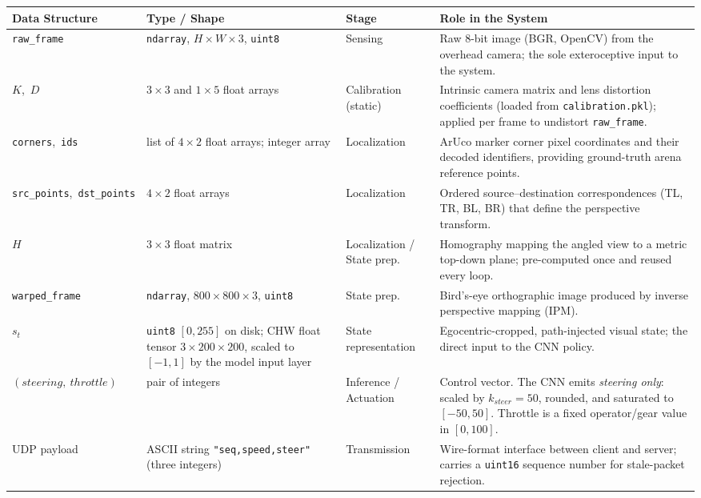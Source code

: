 \begin{table}[H]
\centering
\footnotesize
\renewcommand{\arraystretch}{1.4}
\setlength{\tabcolsep}{4pt}
\begin{tabularx}{\textwidth}{|>{\raggedright\arraybackslash}p{2.4cm}|>{\raggedright\arraybackslash}p{3.2cm}|>{\raggedright\arraybackslash}p{2.1cm}|>{\raggedright\arraybackslash}X|}
\hline
\textbf{Data Structure} & \textbf{Type / Shape} & \textbf{Stage} & \textbf{Role in the System} \\
\hline
\texttt{raw\_frame} & \texttt{ndarray}, $H\times W\times3$, \texttt{uint8} & Sensing & Raw 8-bit image (BGR, OpenCV) from the overhead camera; the sole exteroceptive input to the system. \\
\hline
$K$,\ $D$ & $3\times3$ and $1\times5$ float arrays & Calibration (static) & Intrinsic camera matrix and lens distortion coefficients (loaded from \texttt{calibration.pkl}); applied per frame to undistort \texttt{raw\_frame}. \\
\hline
\texttt{corners},\ \texttt{ids} & list of $4\times2$ float arrays; integer array & Localization & ArUco marker corner pixel coordinates and their decoded identifiers, providing ground-truth arena reference points. \\
\hline
\texttt{src\_points},\ \texttt{dst\_points} & $4\times2$ float arrays & Localization & Ordered source--destination correspondences (TL, TR, BL, BR) that define the perspective transform. \\
\hline
$H$ & $3\times3$ float matrix & Localization / State prep. & Homography mapping the angled view to a metric top-down plane; pre-computed once and reused every loop. \\
\hline
\texttt{warped\_frame} & \texttt{ndarray}, $800\times800\times3$, \texttt{uint8} & State prep. & Bird's-eye orthographic image produced by inverse perspective mapping (IPM). \\
\hline
$s_t$ & \texttt{uint8} $[0,255]$ on disk; CHW float tensor $3\times200\times200$, scaled to $[-1,1]$ by the model input layer & State representation & Egocentric-cropped, path-injected visual state; the direct input to the CNN policy. \\
\hline
$(steering,\ throttle)$ & pair of integers & Inference / Actuation & Control vector. The CNN emits \emph{steering only}: scaled by $k_{steer}=50$, rounded, and saturated to $[-50,50]$. Throttle is a fixed operator/gear value in $[0,100]$. \\
\hline
UDP payload & ASCII string \texttt{"seq,speed,steer"} (three integers) & Transmission & Wire-format interface between client and server; carries a \texttt{uint16} sequence number for stale-packet rejection. \\

\end{tabularx}
\end{table}
